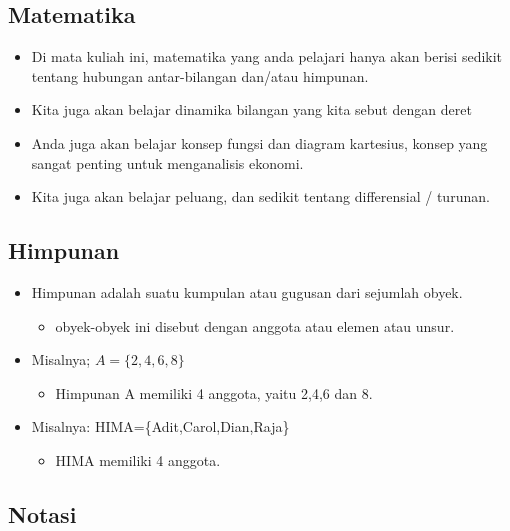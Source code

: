 \documentclass[
  letterpaper,
  DIV=11,
  numbers=noendperiod]{scrartcl}
\providecommand{\tightlist}{%
  \setlength{\itemsep}{0pt}\setlength{\parskip}{0pt}}\usepackage{longtable,booktabs,array}
\begin{document}
\subsection{Matematika}\label{matematika-1}

\begin{itemize}
\item
  Di mata kuliah ini, matematika yang anda pelajari hanya akan berisi
  sedikit tentang hubungan antar-bilangan dan/atau himpunan.
\item
  Kita juga akan belajar dinamika bilangan yang kita sebut dengan deret
\item
  Anda juga akan belajar konsep fungsi dan diagram kartesius, konsep
  yang sangat penting untuk menganalisis ekonomi.
\item
  Kita juga akan belajar peluang, dan sedikit tentang differensial /
  turunan.
\end{itemize}

\subsection{Himpunan}\label{himpunan}

\begin{itemize}
\item
  Himpunan adalah suatu kumpulan atau gugusan dari sejumlah obyek.

  \begin{itemize}
  \tightlist
  \item
    obyek-obyek ini disebut dengan anggota atau elemen atau unsur.
  \end{itemize}
\item
  Misalnya; \(A=\{2,4,6,8\}\)

  \begin{itemize}
  \tightlist
  \item
    Himpunan A memiliki 4 anggota, yaitu 2,4,6 dan 8.
  \end{itemize}
\item
  Misalnya: HIMA=\{Adit,Carol,Dian,Raja\}

  \begin{itemize}
  \tightlist
  \item
    HIMA memiliki 4 anggota.
  \end{itemize}
\end{itemize}

\subsection{Notasi}\label{notasi}
\end{document}
